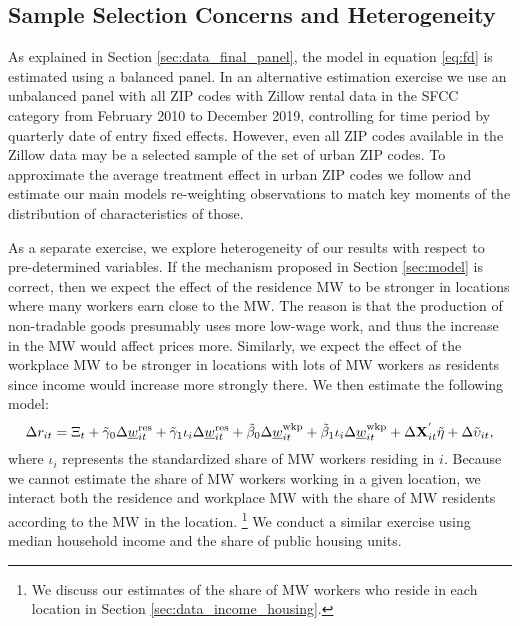 \subsection{Sample Selection Concerns and Heterogeneity}\label{sec:emp_start_heterogeneity}

As explained in Section \ref{sec:data_final_panel}, 
the model in equation \eqref{eq:fd} is estimated using a balanced panel.
In an alternative estimation exercise we use an unbalanced panel with all 
ZIP codes with Zillow rental data in the SFCC category 
from February 2010 to December 2019, controlling for time period by 
quarterly date of entry fixed effects.
However, even all ZIP codes available in the Zillow data may be 
a selected sample of the set of urban ZIP codes.
To approximate the average treatment effect in urban ZIP codes we follow
\textcite{Hainmueller2012} and estimate our main models re-weighting 
observations to match key moments of the distribution of characteristics of 
those.

As a separate exercise, we explore heterogeneity of our results with respect
to pre-determined variables.
If the mechanism proposed in Section \ref{sec:model} is correct, then we
expect the effect of the residence MW to be stronger in locations where many 
workers earn close to the MW.
The reason is that the production of non-tradable goods presumably uses more
low-wage work, and thus the increase in the MW would affect prices more.
Similarly, we expect the effect of the workplace MW to be stronger in locations
with lots of MW workers as residents since income would increase more 
strongly there.
We then estimate the following model:
\begin{equation*}\label{eq:fd_heterogeneity}
    \Delta r_{it} = \Xi_t
                  + \tilde\gamma_0 \Delta \underline{w}^{\text{res}}_{it}
                  + \tilde\gamma_1 \iota_i \Delta \underline{w}^{\text{res}}_{it}
                  + \tilde\beta_0 \Delta \underline{w}^{\text{wkp}}_{it}
                  + \tilde\beta_1 \iota_i \Delta \underline{w}^{\text{wkp}}_{it}
                  + \Delta \mathbf{X}^{'}_{it}\tilde\eta
                  + \Delta \tilde\upsilon_{it} ,
\end{equation*}
where $\iota_i$ represents the standardized share of MW workers residing in $i$.
Because we cannot estimate the share of MW workers working in a given location,
we interact both the residence and workplace MW with the share of MW residents
according to the MW in the location.%
\footnote{We discuss our estimates of the share of MW workers who reside in each 
location in Section \ref{sec:data_income_housing}.}
We conduct a similar exercise using median household income and the share of 
public housing units.
